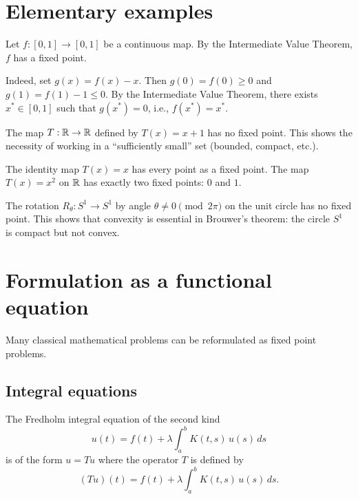 \section{Elementary examples}

\begin{example}
Let $f : [0, 1] \to [0, 1]$ be a continuous map. By the Intermediate Value
Theorem, $f$ has a fixed point.

Indeed, set $g(x) = f(x) - x$. Then $g(0) = f(0) \geq 0$ and
$g(1) = f(1) - 1 \leq 0$. By the Intermediate Value Theorem, there exists
$x^* \in [0,1]$ such that $g(x^*) = 0$, i.e., $f(x^*) = x^*$.
\end{example}

\begin{example}
The map $T : \mathbb{R} \to \mathbb{R}$ defined by $T(x) = x + 1$ has no fixed point. This
shows the necessity of working in a ``sufficiently small'' set (bounded,
compact, etc.).
\end{example}

\begin{example}
The identity map $T(x) = x$ has every point as a fixed point. The map
$T(x) = x^2$ on $\mathbb{R}$ has exactly two fixed points: $0$ and $1$.
\end{example}

\begin{example}
The rotation $R_\theta : S^1 \to S^1$ by angle $\theta \neq 0 \pmod{2\pi}$ on
the unit circle has no fixed point. This shows that convexity is essential in
Brouwer's theorem: the circle $S^1$ is compact but not convex.
\end{example}

\section{Formulation as a functional equation}

Many classical mathematical problems can be reformulated as fixed point problems.

\subsection{Integral equations}

The Fredholm integral equation of the second kind
\[
    u(t) = f(t) + \lambda \int_a^b K(t,s) \, u(s) \, ds
\]
is of the form $u = Tu$ where the operator $T$ is defined by
\[
    (Tu)(t) = f(t) + \lambda \int_a^b K(t,s) \, u(s) \, ds.
\]

